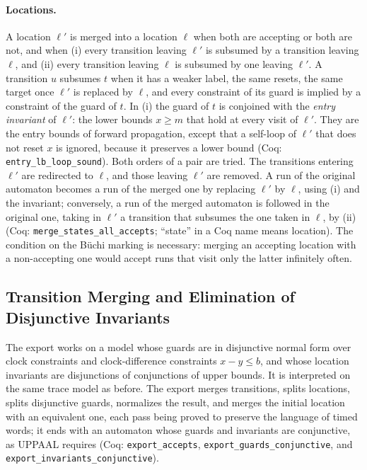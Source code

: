 \paragraph{Locations.}
A location $\ell'$ is merged into a location $\ell$ when both are accepting or
both are not, and when (i) every transition leaving $\ell'$ is subsumed by a
transition leaving $\ell$, and (ii) every transition leaving $\ell$ is subsumed
by one leaving $\ell'$.  A transition $u$ subsumes $t$ when it has a weaker
label, the same resets, the same target once $\ell'$ is replaced by $\ell$, and
every constraint of its guard is implied by a constraint of the guard of $t$.
In (i) the guard of $t$ is conjoined with the \emph{entry invariant} of
$\ell'$: the lower bounds $x\ge m$ that hold at every visit of $\ell'$.  They
are the entry bounds of forward propagation, except that a self-loop of
$\ell'$ that does not reset $x$ is ignored, because it preserves a lower bound
(Coq: \texttt{entry\_\allowbreak{}lb\_\allowbreak{}loop\_\allowbreak{}sound}).
Both orders of a pair are tried.  The transitions entering
$\ell'$ are redirected to $\ell$, and those leaving $\ell'$ are removed.  A run
of the original automaton becomes a run of the merged one by replacing $\ell'$
by $\ell$, using (i) and the invariant; conversely, a run of the merged
automaton is followed in the original one, taking in $\ell'$ a transition that
subsumes the one taken in $\ell$, by (ii)
(Coq: \texttt{merge\_\allowbreak{}states\_\allowbreak{}all\_\allowbreak{}accepts}; ``state'' in a Coq name
means location).  The condition on the B\"uchi marking is necessary: merging
an accepting location with a non-accepting one would accept runs that visit only the latter infinitely
often.


\subsection{Transition Merging and Elimination of Disjunctive Invariants}
\label{subsec:disjunctive-invariants}

The export works on a model whose guards are in disjunctive normal form over
clock constraints and clock-difference constraints $x-y\le b$, and whose
location invariants are disjunctions of conjunctions of upper bounds.  It is
interpreted on the same trace model as before.  The export merges
transitions, splits locations, splits disjunctive guards, normalizes the
result, and merges the initial location with an equivalent one, each pass
being proved to preserve the language of timed words; it
ends with an
automaton whose guards and invariants are conjunctive, as UPPAAL requires
(Coq: \texttt{export\_\allowbreak{}accepts},
\texttt{export\_\allowbreak{}guards\_\allowbreak{}conjunctive}, and
\texttt{export\_\allowbreak{}invariants\_\allowbreak{}conjunctive}).

